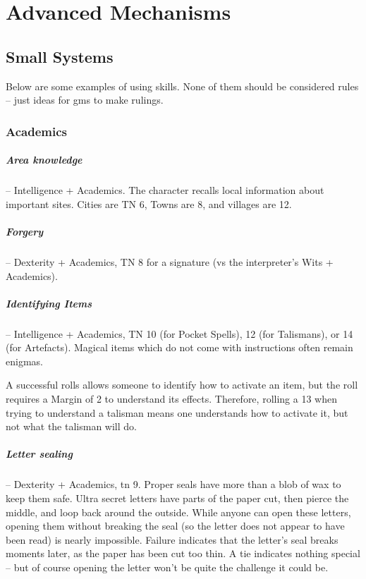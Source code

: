 \chapter{Advanced Mechanisms}

\label{skill_uses}

\section{Small Systems}

\begin{multicols}{2}

Below are some examples of using skills.
None of them should be considered rules -- just ideas for \glspl{gm} to make rulings.

\subsection{Academics}

\paragraph{Area knowledge } -- Intelligence + Academics.
The character recalls local information about important sites.
Cities are TN 6, Towns are 8, and villages are 12.

\paragraph{Forgery} -- Dexterity + Academics, TN 8 for a signature (vs the interpreter's Wits + Academics).

\label{magicidentification}
\paragraph{Identifying Items} -- Intelligence + Academics, TN 10 (for Pocket Spells), 12 (for Talismans), or 14 (for Artefacts).
Magical items which do not come with instructions often remain enigmas.

A successful rolls allows someone to identify how to activate an item, but the roll requires a Margin of 2 to understand its effects.
Therefore, rolling a 13 when trying to understand a talisman means one understands how to activate it, but not what the talisman will do.

\paragraph{Letter sealing} -- Dexterity + Academics, \gls{tn} 9.
\label{letterSealing}
Proper seals have more than a blob of wax to keep them safe.
Ultra secret letters have parts of the paper cut, then pierce the middle, and loop back around the outside.
While anyone can open these letters, opening them without breaking the seal (so the letter does not appear to have been read) is nearly impossible.
Failure indicates that the letter's seal breaks moments later, as the paper has been cut too thin.
A tie indicates nothing special -- but of course opening the letter won't be quite the challenge it could be.


\end{multicols}
